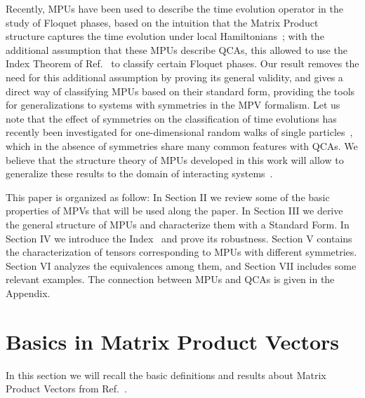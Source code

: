 \documentclass[pra,twocolumn,nofootinbib,superscriptaddress]{revtex4-1}
\begin{document}
Recently, MPUs have been used to describe the time evolution operator in the
study of Floquet phases, based on the intuition that the Matrix Product
structure captures the time evolution under local
Hamiltonians~\cite{po:chiral-floquet-mbl-etal}; with the
additional assumption that these MPUs describe QCAs, this allowed to use
the Index Theorem of Ref.~\cite{gross:index-theorem} to classify certain
Floquet phases.  Our result removes the need for this additional
assumption by proving its general validity, and gives a direct way of
classifying MPUs based on their standard form, providing the tools for
generalizations to systems with symmetries in the MPV formalism. Let us
note that the effect of symmetries on the classification of time
evolutions has recently been investigated for one-dimensional random walks
of single particles~\cite{cedzich:random-walk-classification}, which in
the absence of symmetries share many common features with QCAs. We believe
that the structure theory of MPUs developed in this work will allow to
generalize these results to the domain of interacting
systems~\cite{fidkowski:interacting-floquet-fermions}.

This paper is organized as follow: In Section II we review some of the
basic properties of MPVs that will be used along the paper. In Section III
we derive the general structure of MPUs and characterize them with a
Standard Form. In Section IV we introduce the
Index~\cite{gross:index-theorem} and prove its robustness. Section V
contains the characterization of tensors corresponding to MPUs with
different symmetries. Section VI analyzes the equivalences among them, and
Section VII includes some relevant examples. The connection between MPUs
and QCAs is given in the Appendix.









\section{Basics in Matrix Product Vectors}



In this section we will recall the basic definitions and results about
Matrix Product Vectors from Ref.~\cite{cirac:mpdo-rgfp}.
\end{document}
